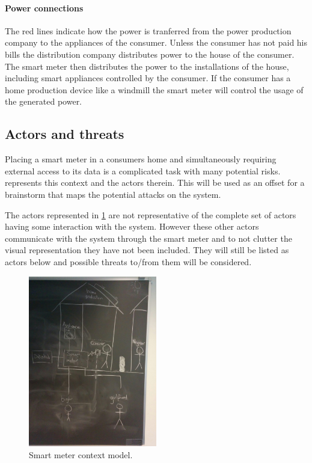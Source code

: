 \paragraph{Power connections}
The red lines indicate how the power is tranferred from the power production company to the appliances of the consumer.
Unless the consumer has not paid his bills the distribution company distributes power to the house of the consumer.
The smart meter then distributes the power to the installations of the house, including smart appliances controlled by the consumer.
If the consumer has a home production device like a windmill the smart meter will control the usage of the generated power.

\subsection{Actors and threats}
Placing a smart meter in a consumers home and simultaneously requiring external access to its data is a complicated task with many potential risks.
 represents this context and the actors therein.
This will be used as an offset for a brainstorm that maps the potential attacks on the system.

The actors represented in \cref{contextual:sm_model} are not representative of the complete set of actors having some interaction with the system.
However these other actors communicate with the system through the smart meter and to not clutter the visual representation they have not been included.
They will still be listed as actors below and possible threats to/from them will be considered.

\begin{figure}
  \centering
  \includegraphics[width=0.5\textwidth]{figures/situation}
  \caption{Smart meter context model.}
  \label{contextual:sm_model}
\end{figure}

